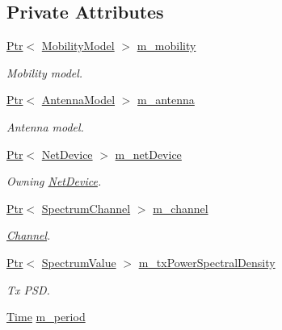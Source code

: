\subsection*{Private Attributes}
\begin{DoxyCompactItemize}
\item 
\hyperlink{classns3_1_1Ptr}{Ptr}$<$ \hyperlink{classns3_1_1MobilityModel}{Mobility\+Model} $>$ \hyperlink{classns3_1_1WaveformGenerator_a2efb4c038ffdd5ce09363102c70ecc6f}{m\+\_\+mobility}
\begin{DoxyCompactList}\small\item\em Mobility model. \end{DoxyCompactList}\item 
\hyperlink{classns3_1_1Ptr}{Ptr}$<$ \hyperlink{classns3_1_1AntennaModel}{Antenna\+Model} $>$ \hyperlink{classns3_1_1WaveformGenerator_a36a1f3e3b98042b688d5f75aece0783a}{m\+\_\+antenna}
\begin{DoxyCompactList}\small\item\em Antenna model. \end{DoxyCompactList}\item 
\hyperlink{classns3_1_1Ptr}{Ptr}$<$ \hyperlink{classns3_1_1NetDevice}{Net\+Device} $>$ \hyperlink{classns3_1_1WaveformGenerator_a7aa25d0649c5fae259f724a5fa48cdb9}{m\+\_\+net\+Device}
\begin{DoxyCompactList}\small\item\em Owning \hyperlink{classns3_1_1NetDevice}{Net\+Device}. \end{DoxyCompactList}\item 
\hyperlink{classns3_1_1Ptr}{Ptr}$<$ \hyperlink{classns3_1_1SpectrumChannel}{Spectrum\+Channel} $>$ \hyperlink{classns3_1_1WaveformGenerator_a509629fc4f14bfa2088aa2333201d4f3}{m\+\_\+channel}
\begin{DoxyCompactList}\small\item\em \hyperlink{classns3_1_1Channel}{Channel}. \end{DoxyCompactList}\item 
\hyperlink{classns3_1_1Ptr}{Ptr}$<$ \hyperlink{classns3_1_1SpectrumValue}{Spectrum\+Value} $>$ \hyperlink{classns3_1_1WaveformGenerator_aaaf34dd52b0c13ad171482849acc4d22}{m\+\_\+tx\+Power\+Spectral\+Density}
\begin{DoxyCompactList}\small\item\em Tx P\+SD. \end{DoxyCompactList}\item 
\hyperlink{classns3_1_1Time}{Time} \hyperlink{classns3_1_1WaveformGenerator_ae6c7e737791fc378b8efae9b2fae48e3}{m\+\_\+period}

\end{DoxyCompactItemize}
